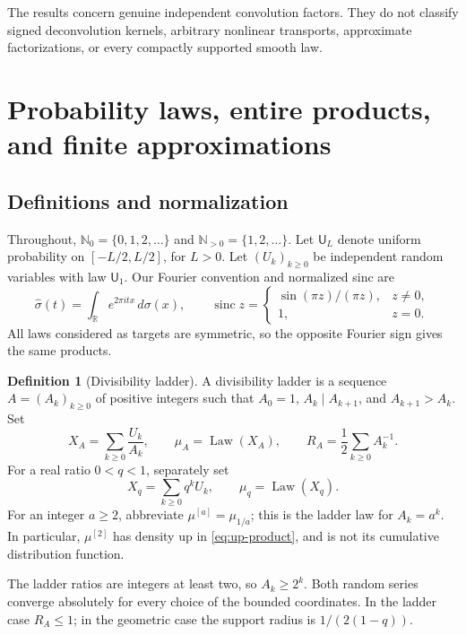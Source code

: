 \documentclass[11pt,a4paper]{article}
\theoremstyle{definition}
\newtheorem{definition}[theorem]{Definition}
\theoremstyle{remark}
\newcommand{\R}{\mathbb R}
\newcommand{\N}{\mathbb N}
\newcommand{\Law}{\operatorname{Law}}
\newcommand{\sinc}{\operatorname{sinc}}
\newcommand{\Unif}{\mathsf U}
\newcommand{\Mu}[1]{\mu^{[#1]}}
\begin{document}
The results concern genuine independent convolution factors. They do not
classify signed deconvolution kernels, arbitrary nonlinear transports,
approximate factorizations, or every compactly supported smooth law.

\section{Probability laws, entire products, and finite approximations}
\label{sec:preliminaries}

\subsection{Definitions and normalization}
Throughout, $\N_0=\{0,1,2,\ldots\}$ and $\N_{>0}=\{1,2,\ldots\}$.
Let $\Unif_L$ denote uniform probability on $[-L/2,L/2]$, for $L>0$.
Let $(U_k)_{k\ge0}$ be independent random variables with law $\Unif_1$.
Our Fourier convention and normalized sinc are
\[
 \widehat\sigma(t)=\int_\R e^{2\pi itx}\,d\sigma(x),\qquad
 \sinc z=\begin{cases}\sin(\pi z)/(\pi z),&z\ne0,\\1,&z=0.\end{cases}
\]
All laws considered as targets are symmetric, so the opposite Fourier sign
gives the same products.

\begin{definition}[Divisibility ladder]
A divisibility ladder is a sequence $A=(A_k)_{k\ge0}$ of positive integers
such that $A_0=1$, $A_k\mid A_{k+1}$, and $A_{k+1}>A_k$. Set
\begin{equation}\label{eq:ladder-law}
 X_A=\sum_{k\ge0}\frac{U_k}{A_k},\qquad
 \mu_A=\Law(X_A),\qquad R_A=\frac12\sum_{k\ge0}A_k^{-1}.
\end{equation}
For a real ratio $0<q<1$, separately set
\begin{equation}\label{eq:geometric-law}
 X_q=\sum_{k\ge0}q^kU_k,\qquad \mu_q=\Law(X_q).
\end{equation}
For an integer $a\ge2$, abbreviate $\Mu a=\mu_{1/a}$; this is the ladder
law for $A_k=a^k$. In particular, $\Mu2$ has density $\mathrm{up}$ in
\eqref{eq:up-product}, and is not its cumulative distribution function.
\end{definition}

The ladder ratios are integers at least two, so $A_k\ge2^k$.
Both random series converge absolutely for every choice of the bounded
coordinates. In the ladder case $R_A\le1$; in the geometric case the
support radius is $1/(2(1-q))$.
\end{document}
